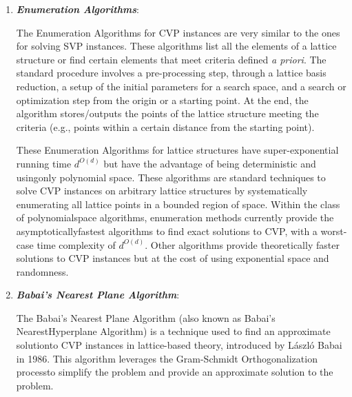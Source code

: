 \documentclass[runningheads]{llncs}
\numberwithin{equation}{section}
\begin{document}
    \begin{enumerate}
        \item \textbf{\textit{Enumeration Algorithms}}:
        \vspace{0.6ex}
        
        The Enumeration Algorithms \cite{fincke-pohst:improved-methods-calculating-vectors-short-length-lattice-including-complexity-analysis:1985:06-2024,kannan:minkowski-convex-body-theorem-and-integer-programming:1987:06-2024,hanrot-stehle:improved-analysis-kannan-shortest-lattice-vector-algorithms:2007:06-2024,pujol-stehle:rigorous-and-efficient-short-lattice-vectors-enumeration:2008:06-2024,micciancio-walter:fast-lattice-point-enumeration-minimal-overhead:2015:06-2024} for CVP instances are very similar to the ones for solving SVP instances. These algorithms list all the elements of a lattice structure or find certain elements that meet criteria defined \textit{a priori}. The standard procedure involves a pre-processing step, through a lattice basis reduction, a setup of the initial parameters for a search space, and a search or optimization step from the origin or a starting point. At the end, the algorithm stores/outputs the points of the lattice structure meeting the criteria (e.g., points within a certain distance from the starting point).
        
        These Enumeration Algorithms for lattice structures have super-exponential running time ${d}^{O(d)}$ but have the advantage of being deterministic and using\break only polynomial space. These algorithms are standard techniques to solve CVP instances on arbitrary lattice structures by systematically enumerating all lattice points in a bounded region of space. Within the class of polynomial\break space algorithms, enumeration methods currently provide the asymptotically\break fastest algorithms to find exact solutions to CVP, with a worst-case time complexity of ${d}^{O(d)}$. Other algorithms provide theoretically faster solutions to CVP instances but at the cost of using exponential space and randomness.

        \vspace{2ex}
        \item \textbf{\textit{Babai's Nearest Plane Algorithm}}:
        \vspace{0.6ex}

        The Babai's Nearest Plane Algorithm \cite{babai:lovasz-lattice-reduction-and-nearest-lattice-point-problem:1986:06-2024} (also known as Babai's Nearest\break Hyperplane Algorithm) is a technique used to find an approximate solution\break to CVP instances in lattice-based theory, introduced by L\'{a}szl\'{o} Babai in 1986. This algorithm leverages the Gram-Schmidt Orthogonalization process\break to simplify the problem and provide an approximate solution to the problem.


\end{enumerate}
\end{document}
